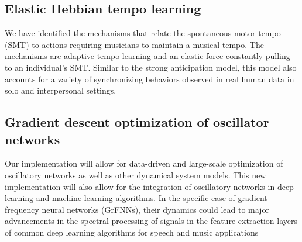 \documentclass{report}
\begin{document}
\subsection{Elastic Hebbian tempo learning}
We have identified the mechanisms that relate the spontaneous motor tempo (SMT) to actions requiring musicians to maintain a musical tempo. The mechanisms are adaptive tempo learning and an elastic force constantly pulling to an individual's SMT. Similar to the strong anticipation model, this model also accounts for a variety of synchronizing behaviors observed in real human data in solo and interpersonal settings.

\subsection{Gradient descent optimization of oscillator networks}
Our implementation will allow for data-driven and large-scale optimization of oscillatory networks as well as other dynamical system models. This new implementation will also allow for the integration of oscillatory networks in deep learning and machine learning algorithms. In the specific case of gradient frequency neural networks (GrFNNs), their dynamics could lead to major advancements in the spectral processing of signals in the feature extraction layers of common deep learning algorithms for speech and music applications


\appendix
\end{document}
